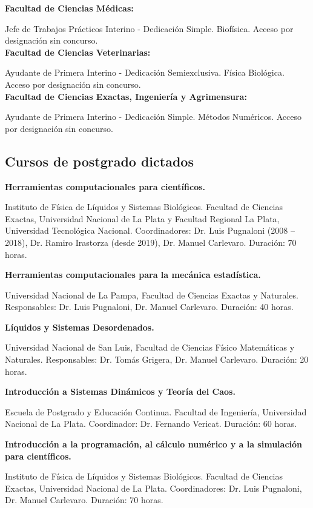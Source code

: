 \textbf{Facultad de Ciencias Médicas:}

 Jefe de Trabajos Prácticos Interino - Dedicación Simple. Biofísica. Acceso por designación sin concurso. \\

\textbf{Facultad de Ciencias Veterinarias:}

 Ayudante de Primera Interino - Dedicación Semiexclusiva. Física Biológica. Acceso por designación sin concurso.\\

\textbf{Facultad de Ciencias Exactas, Ingeniería y Agrimensura:}

 Ayudante de Primera Interino - Dedicación Simple. Métodos Numéricos. Acceso por designación sin concurso.

\subsection{Cursos de postgrado dictados}

 \textbf{Herramientas computacionales para científicos.}

 Instituto de Física de Líquidos y Sistemas Biológicos. Facultad de Ciencias Exactas, Universidad Nacional de La Plata y Facultad Regional La Plata, Universidad Tecnológica Nacional. Coordinadores: Dr. Luis Pugnaloni (2008 -- 2018), Dr. Ramiro Irastorza (desde 2019), Dr. Manuel Carlevaro. Duración: 70 horas.

  \textbf{Herramientas computacionales para la mecánica estadística.}

Universidad Nacional de La Pampa, Facultad de Ciencias Exactas y Naturales. Responsables: Dr. Luis Pugnaloni, Dr. Manuel Carlevaro. Duración: 40 horas.

 
 \textbf{Líquidos y Sistemas Desordenados.}

Universidad Nacional de San Luis, Facultad de Ciencias Físico Matemáticas y Naturales. Responsables: Dr. Tomás Grigera, Dr. Manuel Carlevaro. Duración: 20 horas.


  \textbf{Introducción a Sistemas Dinámicos y Teoría del Caos.}
 
 Escuela de Postgrado y Educación Continua. Facultad de Ingeniería, Universidad Nacional de La Plata. Coordinador: Dr. Fernando Vericat. Duración: 60 horas.
 
  \textbf{Introducción a la programación, al cálculo numérico y a la simulación para científicos.}
 
 Instituto de Física de Líquidos y Sistemas Biológicos. Facultad de Ciencias Exactas, Universidad Nacional de La Plata. Coordinadores: Dr. Luis Pugnaloni, Dr. Manuel Carlevaro. Duración: 70 horas.
